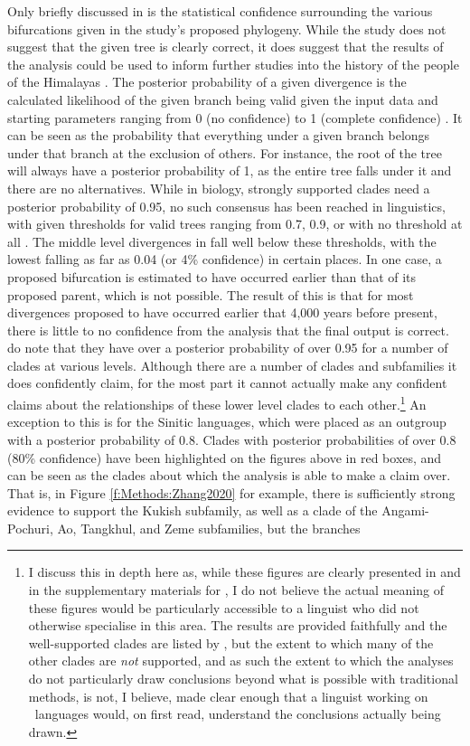 Only briefly discussed in  is the statistical confidence surrounding the various bifurcations given in the study's proposed phylogeny. While the study does not suggest that the given tree is clearly correct, it does suggest that the results of the analysis could be used to inform further studies into the history of the people of the Himalayas \cite[5]{ZhangH2020Baye}. The posterior probability of a given divergence is the calculated likelihood of the given branch being valid given the input data and starting parameters ranging from 0 (no  confidence) to 1 (complete confidence) \cite{Alfaro2006}. It can be seen as the probability that everything under a given branch belongs under that branch at the exclusion of others. For instance, the root of the tree will always have a posterior probability of 1, as the entire tree falls under it and there are no alternatives. While in biology, strongly supported clades need a posterior probability of 0.95, no such consensus has been reached in linguistics, with given thresholds for valid trees ranging from 0.7, 0.9, or with no threshold at all \cite{Dolin2022}. The middle level divergences in  fall well below these thresholds, with the lowest falling as far as 0.04 (or 4\% confidence) in certain places. In one case, a proposed bifurcation is estimated to have occurred earlier than that of its proposed parent, which is not possible. The result of this is that for most divergences proposed to have occurred earlier that 4,000 years before present, there is little to no confidence from the analysis that the final output is correct.  do note that they have over a posterior probability of over 0.95 for a number of clades at various levels. Although there are a number of clades and subfamilies it does confidently claim, for the most part it cannot actually make any confident claims about the relationships of these lower level clades to each other.\footnote{I discuss this in depth here as, while these figures are clearly presented in  and in the supplementary materials for , I do not believe the actual meaning of these figures would be particularly accessible to a linguist who did not otherwise specialise in this area. The results are provided faithfully and the well-supported clades are listed by , but the extent to which many of the other clades are \textit{not} supported, and as such the extent to which the analyses do not particularly draw conclusions beyond what is possible with traditional methods, is not, I believe, made clear enough that a linguist working on \lfam\ languages would, on first read, understand the conclusions actually being drawn.} An exception to this is for the Sinitic languages, which were placed as an outgroup with a posterior probability of 0.8. Clades with posterior probabilities of over 0.8 (80\% confidence) have been highlighted on the figures above in red boxes, and can be seen as the clades about which the analysis is able to make a claim over. That is, in Figure \ref{f:Methods:Zhang2020} for example, there is sufficiently strong evidence to support the Kukish subfamily, as well as a clade of the Angami-Pochuri, Ao, Tangkhul, and Zeme subfamilies, but the branches 